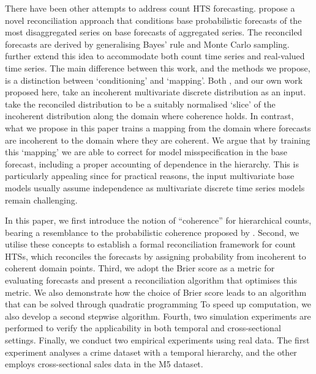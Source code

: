\documentclass[a4paper,review,12pt,authoryear]{elsarticle}
\theoremstyle{definition}
\begin{document}
There have been other attempts to address count HTS forecasting.
\cite{coraniProbabilisticReconciliationCount2022} propose a novel reconciliation approach that conditions base probabilistic forecasts of the most disaggregated series on base forecasts of aggregated series.
The reconciled forecasts are derived by generalising Bayes’ rule and Monte Carlo sampling.
\cite{zambonEfficientProbabilisticReconciliation2022} further extend this idea to accommodate both count time series and real-valued time series. The main difference between this work, and the methods we propose, is a distinction between `conditioning' and `mapping'. Both \cite{zambonEfficientProbabilisticReconciliation2022}, and our own work proposed here, take an incoherent multivariate discrete distribution as an input.  \cite{zambonEfficientProbabilisticReconciliation2022} take the reconciled distribution to be a suitably normalised `slice' of the incoherent distribution along the domain where coherence holds. In contrast, what we propose in this paper trains a mapping from the domain where forecasts are incoherent to the domain where they are coherent. We argue that by training this `mapping' we are able to correct for model misspecification in the base forecast, including a proper accounting of dependence in the hierarchy. This is particularly appealing since for practical reasons, the input multivariate base models usually assume independence as multivariate discrete time series models remain challenging.

In this paper,  we first introduce the notion of ``coherence'' for hierarchical counts,
bearing a resemblance to the probabilistic coherence proposed by \cite{panagiotelisProbabilisticForecastReconciliation2022}.
Second, we utilise these concepts to establish a formal reconciliation framework for count HTSs, which reconciles the forecasts by assigning probability from incoherent to coherent domain points.
Third, we adopt the Brier score as a metric for evaluating forecasts and present a reconciliation algorithm that optimises this metric.
We also demonstrate how the choice of Brier score leads to an algorithm that can be solved through quadratic programming To speed up computation, we also develop a second stepwise algorithm.
Fourth, two simulation experiments are performed to verify the applicability in both temporal and cross-sectional settings.
Finally, we conduct two empirical experiments using real data. The first experiment analyses a crime dataset with a temporal hierarchy, and the other employs cross-sectional sales data in the M5 dataset.
\end{document}
